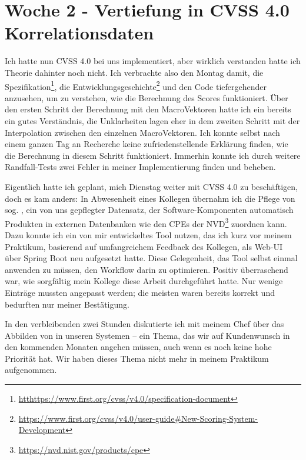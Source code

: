 \section{Woche 2 - Vertiefung in CVSS 4.0 \headerand Korrelationsdaten} \label{sec:bericht-wo-2}



Ich hatte nun CVSS 4.0 bei uns implementiert, aber wirklich verstanden hatte ich Theorie dahinter noch nicht.
Ich verbrachte also den Montag damit, die Spezifikation\footnote{\url{htthttps://www.first.org/cvss/v4.0/specification-document}},
die Entwicklungsgeschichte\footnote{\url{https://www.first.org/cvss/v4.0/user-guide\#New-Scoring-System-Development}}
und den Code tiefergehender anzusehen, um zu verstehen, wie die Berechnung des Scores funktioniert.
Über den ersten Schritt der Berechnung mit den MacroVektoren hatte ich ein bereits ein gutes Verständnis, die Unklarheiten lagen eher in dem zweiten Schritt mit der Interpolation zwischen den einzelnen MacroVektoren.
Ich konnte selbst nach einem ganzen Tag an Recherche keine zufriedenstellende Erklärung finden, wie die Berechnung in diesem Schritt funktioniert.
Immerhin konnte ich durch weitere Randfall-Tests zwei Fehler in meiner Implementierung finden und beheben.


Eigentlich hatte ich geplant, mich Dienstag weiter mit CVSS 4.0 zu beschäftigen, doch es kam anders:
In Abwesenheit eines Kollegen übernahm ich die Pflege von sog. , ein von uns gepflegter Datensatz, der Software-Komponenten automatisch Produkten in externen Datenbanken wie den CPEs der NVD\footnote{\url{https://nvd.nist.gov/products/cpe}} zuordnen kann.
Dazu konnte ich ein von mir entwickeltes Tool nutzen, das ich kurz vor meinem Praktikum, basierend auf umfangreichem Feedback des Kollegen, als Web-UI über Spring Boot neu aufgesetzt hatte.
Diese Gelegenheit, das Tool selbst einmal anwenden zu müssen, den Workflow darin zu optimieren.
Positiv überraschend war, wie sorgfältig mein Kollege diese Arbeit durchgeführt hatte.
Nur wenige Einträge mussten angepasst werden; die meisten waren bereits korrekt und bedurften nur meiner Bestätigung.

In den verbleibenden zwei Stunden diskutierte ich mit meinem Chef über das Abbilden von  in unseren Systemen – ein Thema, das wir auf Kundenwunsch in den kommenden Monaten angehen müssen, auch wenn es noch keine hohe Priorität hat.
Wir haben dieses Thema nicht mehr in meinem Praktikum aufgenommen.

